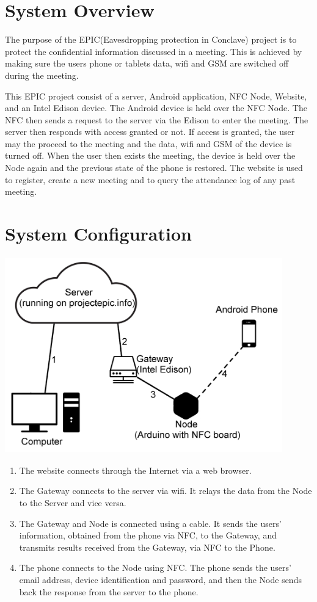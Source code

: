 \documentclass[a4paper,12pt,titlepage]{article}
\begin{document}

\tableofcontents


\newpage
\section{System Overview}
The purpose of the EPIC(Eavesdropping protection in Conclave) project is to protect the confidential information discussed in a meeting. This is achieved by making sure the users phone or tablets data, wifi and GSM are switched off during the meeting.

This EPIC project consist of a server, Android application, NFC Node, Website, and an Intel Edison device. 
The Android device is held over the NFC Node. The NFC then sends a request to the server via the Edison to enter the meeting. The server then responds with access granted or not. If access is granted, the user may the proceed to the meeting and the data, wifi and GSM of the device is turned off. When the user then exists the meeting, the device is held over the Node again and the previous state of the phone is restored. 
The website is used to register, create a new meeting and to query the attendance log of any past meeting.

\newpage
\section{System Configuration}

\includegraphics[width=12cm, height=8.5cm]{SystemLayout}
\begin{enumerate}
\item The website connects through the Internet via a web browser.
\item The Gateway connects to the server via wifi. It relays the data from the Node to the Server and vice versa.
\item The Gateway and Node is connected using a cable. It sends the users' information, obtained from the phone via NFC, to the Gateway, and transmits results  received from the Gateway, via NFC to the Phone.
\item The phone connects to the Node using NFC. The phone sends the users' email address, device identification and password, and then the Node sends back the response from the server to the phone.
\end{enumerate}
\end{document}
